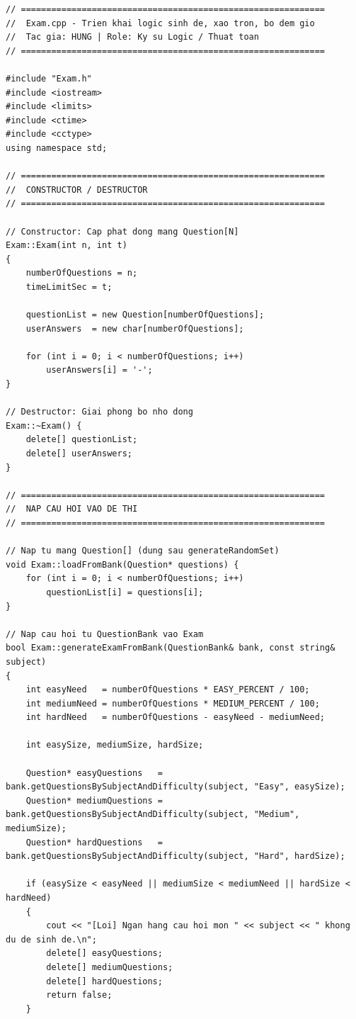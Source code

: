 \documentclass[11pt]{report}
\begin{document}
\begin{lstlisting}[caption={Exam.cpp -- Cài đặt logic sinh đề, xáo trộn, bộ đếm giờ}, label={lst:full_exam_cpp}]
// ============================================================
//  Exam.cpp - Trien khai logic sinh de, xao tron, bo dem gio
//  Tac gia: HUNG | Role: Ky su Logic / Thuat toan
// ============================================================

#include "Exam.h"
#include <iostream>
#include <limits>
#include <ctime>
#include <cctype>
using namespace std;

// ============================================================
//  CONSTRUCTOR / DESTRUCTOR
// ============================================================

// Constructor: Cap phat dong mang Question[N]
Exam::Exam(int n, int t)
{
    numberOfQuestions = n;
    timeLimitSec = t;

    questionList = new Question[numberOfQuestions];
    userAnswers  = new char[numberOfQuestions];

    for (int i = 0; i < numberOfQuestions; i++)
        userAnswers[i] = '-';
}

// Destructor: Giai phong bo nho dong
Exam::~Exam() {
    delete[] questionList;
    delete[] userAnswers;
}

// ============================================================
//  NAP CAU HOI VAO DE THI
// ============================================================

// Nap tu mang Question[] (dung sau generateRandomSet)
void Exam::loadFromBank(Question* questions) {
    for (int i = 0; i < numberOfQuestions; i++)
        questionList[i] = questions[i];
}

// Nap cau hoi tu QuestionBank vao Exam
bool Exam::generateExamFromBank(QuestionBank& bank, const string& subject)
{
    int easyNeed   = numberOfQuestions * EASY_PERCENT / 100;
    int mediumNeed = numberOfQuestions * MEDIUM_PERCENT / 100;
    int hardNeed   = numberOfQuestions - easyNeed - mediumNeed;

    int easySize, mediumSize, hardSize;

    Question* easyQuestions   = bank.getQuestionsBySubjectAndDifficulty(subject, "Easy", easySize);
    Question* mediumQuestions = bank.getQuestionsBySubjectAndDifficulty(subject, "Medium", mediumSize);
    Question* hardQuestions   = bank.getQuestionsBySubjectAndDifficulty(subject, "Hard", hardSize);

    if (easySize < easyNeed || mediumSize < mediumNeed || hardSize < hardNeed)
    {
        cout << "[Loi] Ngan hang cau hoi mon " << subject << " khong du de sinh de.\n";
        delete[] easyQuestions;
        delete[] mediumQuestions;
        delete[] hardQuestions;
        return false;
    }


\end{lstlisting}
\end{document}
